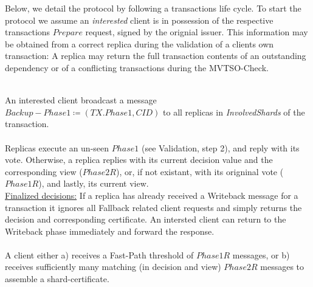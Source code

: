 Below, we detail the protocol by following a transactions life cycle. To start the protocol we assume an \textit{interested} client is in possession of the respective transactions $Prepare$ request, signed by the orignial issuer. This information may be obtained from a correct replica during the validation of a clients own transaction: A replica may return the full transaction contents of an outstanding dependency or of a conflicting transactions during the MVTSO-Check.



\\
An interested client broadcast a message $Backup-Phase1 \coloneqq (TX.Phase1, CID)$ to all replicas in \textit{InvolvedShards} of the transaction. \\
\\
Replicas execute an un-seen $Phase1$ (see Validation, step 2), and reply with its vote. Otherwise, a replica replies with its current decision value and the corresponding view ($Phase2R$), or, if not existant, with its origninal vote ($Phase1R$), and lastly, its current view.\\
\underline{Finalized decisions:} If a replica has already received a Writeback message for a transaction it ignores all Fallback related client requests and simply returns the decision and corresponding certificate. An intersted client can return to the Writeback phase immediately and forward the response.\\
\\
A client either a) receives a Fast-Path threshold of $Phase1R$ messages, or b) receives sufficiently many matching (in decision and view) $Phase2R$ messages to assemble a shard-certificate. \\
\\

